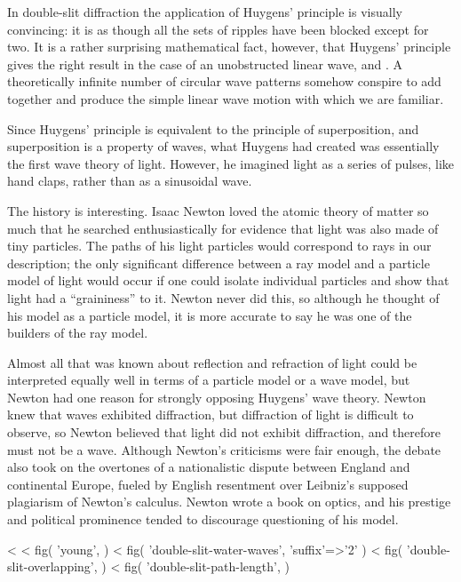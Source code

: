 In double-slit diffraction the application of Huygens'
principle is visually convincing: it is as though all the
sets of ripples have been blocked except for two. It is a
rather surprising mathematical fact, however, that Huygens'
principle gives the right result in the case of an
unobstructed linear wave,  and . A theoretically
infinite number of circular wave patterns somehow conspire
to add together and produce the simple linear wave motion
with which we are familiar.

Since Huygens' principle is equivalent to the principle of
superposition, and superposition is a property of waves,
what Huygens had created was essentially the first wave
theory of light. However, he imagined light as a series of
pulses, like hand claps, rather than as a sinusoidal wave.

The history is interesting. Isaac Newton
loved the atomic theory of matter so much that he searched
enthusiastically for evidence that light was also made of
tiny particles. The paths of his light particles would
correspond to rays in our description; the only significant
difference between a ray model and a particle model of light
would occur if one could isolate individual particles and
show that light had a ``graininess'' to it. Newton never did
this, so although he thought of his model as a particle
model, it is more accurate to say he was one of the builders
of the ray model.

Almost all that was known about reflection and refraction of
light could be interpreted equally well in terms of a
particle model or a wave
model, but Newton had one reason for strongly opposing
Huygens' wave theory. Newton knew
that waves exhibited diffraction, but diffraction of light
is difficult to observe, so Newton believed that light did
not exhibit diffraction, and therefore must not be a wave.
Although Newton's criticisms were fair enough, the debate
also took on the overtones of a nationalistic dispute
between England and continental Europe, fueled by English
resentment over Leibniz's supposed plagiarism of Newton's
calculus. Newton wrote a book on optics, and his prestige
and political prominence tended to discourage questioning of his model.

<%
<%
  fig(
    'young',
  )
\spacebetweenfigs
<%
  fig(
    'double-slit-water-waves',
    {'suffix'=>'2'}
  )
\spacebetweenfigs
<%
  fig(
    'double-slit-overlapping',
  )
\spacebetweenfigs
<%
  fig(
    'double-slit-path-length',
  )

